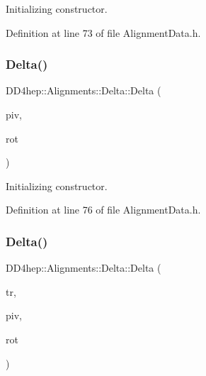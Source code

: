 Initializing constructor. 



Definition at line 73 of file Alignment\+Data.\+h.

\hypertarget{class_d_d4hep_1_1_alignments_1_1_delta_a8ade447b698a6765cf76eb5e98af91ad}{}\label{class_d_d4hep_1_1_alignments_1_1_delta_a8ade447b698a6765cf76eb5e98af91ad} 
\subsubsection{\texorpdfstring{Delta()}{Delta()}\hspace{0.1cm}{\footnotesize\ttfamily [5/7]}}
{\footnotesize\ttfamily D\+D4hep\+::\+Alignments\+::\+Delta\+::\+Delta (\begin{DoxyParamCaption}\item[{const Translation3D \&}]{piv,  }\item[{const Rotation\+Z\+YX \&}]{rot }\end{DoxyParamCaption})\hspace{0.3cm}{\ttfamily [inline]}}



Initializing constructor. 



Definition at line 76 of file Alignment\+Data.\+h.

\hypertarget{class_d_d4hep_1_1_alignments_1_1_delta_a1694ccda25ab2214ec8145c36153ab37}{}\label{class_d_d4hep_1_1_alignments_1_1_delta_a1694ccda25ab2214ec8145c36153ab37} 
\subsubsection{\texorpdfstring{Delta()}{Delta()}\hspace{0.1cm}{\footnotesize\ttfamily [6/7]}}
{\footnotesize\ttfamily D\+D4hep\+::\+Alignments\+::\+Delta\+::\+Delta (\begin{DoxyParamCaption}\item[{const Position \&}]{tr,  }\item[{const Translation3D \&}]{piv,  }\item[{const Rotation\+Z\+YX \&}]{rot }\end{DoxyParamCaption})\hspace{0.3cm}{\ttfamily [inline]}}



